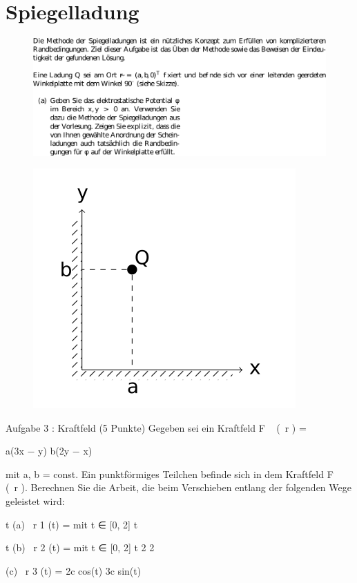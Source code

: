 \section{Spiegelladung}
\label{sec:Spiegelladung}
\begin{figure}
 \centering
 \includegraphics{media/spiegelladung.pdf}
 \label{fig:Spiegelladung}
\end{figure}
\begin{figure}
    \centering
    \includegraphics{media/Skizze.png}
    \label{fig:Spiegelladung}
   \end{figure}
\pagebreak
Aufgabe 3 : Kraftfeld
(5 Punkte)
Gegeben sei ein Kraftfeld
F ~ (~r ) =

a(3x − y)
b(2y − x)

mit a, b = const.
Ein punktförmiges Teilchen befinde sich in dem Kraftfeld F ~ (~r ). Berechnen Sie die Arbeit, die
beim Verschieben entlang der folgenden Wege geleistet wird:
 
t
(a) ~r 1 (t) =
mit t ∈ [0, 2]
t


t
(b) ~r 2 (t) =
mit t ∈ [0, 2]
t 2
2

(c) ~r 3 (t) =
2c cos(t)
3c sin(t)

